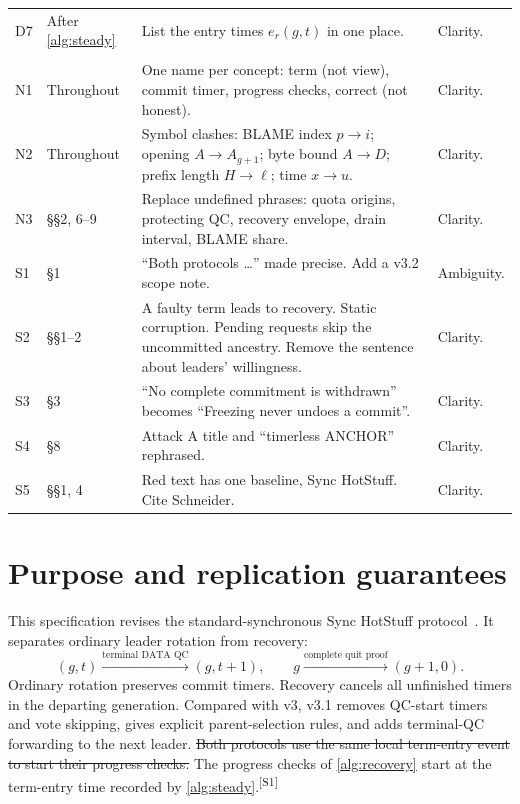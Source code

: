 \documentclass[11pt,a4paper]{article}
\newcommand{\NEW}[1]{{\color{diffNew}#1}}
\newcommand{\DEL}[1]{{\color{diffDel}\sout{#1}}}
\newcommand{\CH}[1]{\textsuperscript{\color{diffNew}\sffamily\scriptsize[#1]}}
\newcommand{\NEW}[1]{#1}
\newcommand{\DEL}[1]{}
\newcommand{\CH}[1]{}
\newcounter{protocol}
\begin{document}
{\begin{xltabular}{\linewidth}{@{}>{\raggedright\arraybackslash}p{.05\linewidth}
 >{\raggedright\arraybackslash}p{.15\linewidth} Y
 >{\raggedright\arraybackslash}p{.27\linewidth}@{}}
D7 & After \cref{alg:steady} & List the entry times $e_r(g,t)$ in one
place. & Clarity.\\
\\
N1 & Throughout & One name per concept: term (not view), commit timer,
progress checks, correct (not honest). & Clarity.\\
N2 & Throughout & Symbol clashes: BLAME index $p\to i$; opening
$A\to A_{g+1}$; byte bound $A\to D$; prefix length $H\to\ell$; time
$x\to u$. & Clarity.\\
N3 & \S\S2, 6--9 & Replace undefined phrases: quota origins, protecting
QC, recovery envelope, drain interval, BLAME share. & Clarity.\\
S1 & \S1 & ``Both protocols \ldots'' made precise. Add a v3.2 scope note. &
Ambiguity.\\
S2 & \S\S1--2 & A faulty term leads to recovery. Static corruption.
Pending requests skip the uncommitted ancestry. Remove the sentence about
leaders' willingness. & Clarity.\\
S3 & \S3 & ``No complete commitment is withdrawn'' becomes ``Freezing
never undoes a commit''. & Clarity.\\
S4 & \S8 & Attack A title and ``timerless ANCHOR'' rephrased. & Clarity.\\
S5 & \S\S1, 4 & Red text has one baseline, Sync HotStuff. Cite
Schneider. & Clarity.\\
\end{xltabular}
}
\clearpage
\fi

\section{Purpose and replication guarantees}
\label{sec:scope}
This specification revises the standard-synchronous Sync HotStuff
protocol~\cite{sync}. It separates ordinary leader rotation from recovery:
\[
 (g,t)\xrightarrow{\text{terminal DATA QC}}(g,t+1),
 \qquad
 g\xrightarrow{\text{complete quit proof}}(g+1,0).
\]
Ordinary rotation preserves commit timers. Recovery cancels all unfinished
timers in the departing generation. Compared with v3, \NEW{v3.1} removes
QC-start timers and vote skipping, gives explicit parent-selection rules,
and adds terminal-QC forwarding to the next leader.
\DEL{Both protocols use the same local term-entry event to start their
progress checks.} \NEW{The progress checks of \cref{alg:recovery} start at
the term-entry time recorded by \cref{alg:steady}.}\CH{S1}
\end{document}
